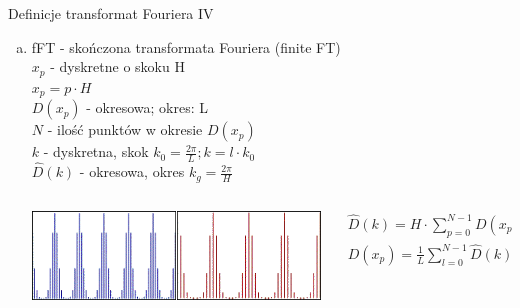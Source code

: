 \begin{frame}{Definicje transformat Fouriera IV}
	\begin{enumerate}[d)]
		\item fFT - skończona transformata Fouriera (finite FT) \\
		$x_p$ - dyskretne o skoku H \\
		$x_p = p \cdot H$ \\
		$D(x_p)$ - okresowa; okres: L \\
		$N$ - ilość punktów w okresie $D(x_p)$ \\
		$k$ - dyskretna, skok $k_0 = \frac{2 \pi}{L}; k = l \cdot k_0$ \\
		$\widehat{D}(k)$ - okresowa, okres $k_g = \frac{2 \pi}{H}$
		\begin{columns}
            \begin{column}{0.35\textwidth}
                \includegraphics[width=\textwidth]{img/16/dft_wykres1.png}
            \end{column}
            \begin{column}{0.65\textwidth}
                \begin{block}
                    \centering
                    \renewcommand{\arraystretch}{1.5}
                    \setlength{\abovedisplayskip}{0pt}
                    \setlength{\belowdisplayskip}{0pt}
                    \setlength{\abovedisplayshortskip}{0pt}
                    \setlength{\belowdisplayshortskip}{0pt}
                    \[
                        \begin{array}{c}
                        \widehat{D}(k) = H \cdot \sum\limits_{p = 0}^{N-1} D(x_p) e^{-ikx_p} \\
                        D(x_p) = \frac{1}{L} \sum\limits_{l = 0}^{N-1} \widehat{D}(k) e^{ikx_p}
                        \end{array}
                        \tag{16.4}
                    \]
                \end{block}
			\end{column}
		\end{columns}
	\end{enumerate}
\end{frame}
